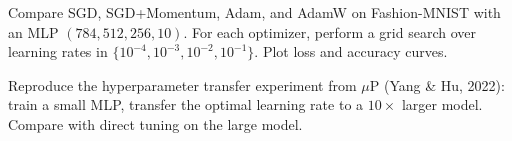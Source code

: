 \begin{exercise}
Compare SGD, SGD+Momentum, Adam, and AdamW on Fashion-MNIST with an MLP $(784, 512, 256, 10)$. For each optimizer, perform a grid search over learning rates in $\{10^{-4}, 10^{-3}, 10^{-2}, 10^{-1}\}$. Plot loss and accuracy curves.
\end{exercise}

\begin{exercise}
Reproduce the hyperparameter transfer experiment from $\mu$P (Yang \& Hu, 2022): train a small MLP, transfer the optimal learning rate to a $10\times$ larger model. Compare with direct tuning on the large model.
\end{exercise}
